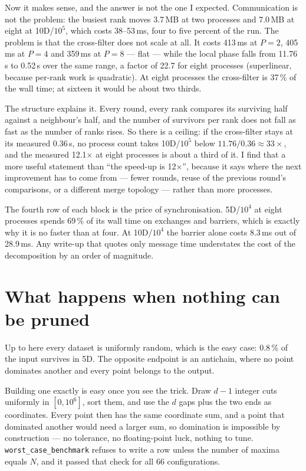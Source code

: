 \documentclass[11pt,a4paper]{article}
\newcommand{\code}[1]{\texttt{#1}}
\begin{document}
Now it makes sense, and the answer is not the one I expected. Communication is
not the problem: the busiest rank moves 3.7\,MB at two processes and 7.0\,MB at
eight at 10D/$10^5$, which costs 38--53\,ms, four to five percent of the run.
The problem is that the cross-filter does not scale at all. It costs 413\,ms at
$P=2$, 405\,ms at $P=4$ and 359\,ms at $P=8$ --- flat --- while the local phase
falls from 11.76\,s to 0.52\,s over the same range, a factor of 22.7 for eight
processes (superlinear, because per-rank work is quadratic). At eight processes
the cross-filter is 37\,\% of the wall time; at sixteen it would be about two
thirds.

The structure explains it. Every round, every rank compares its surviving half
against a neighbour's half, and the number of survivors per rank does not fall as
fast as the number of ranks rises. So there is a ceiling: if the cross-filter
stays at its measured 0.36\,s, no process count takes 10D/$10^5$ below
$11.76/0.36 \approx 33\times$, and the measured 12.1$\times$ at eight processes
is about a third of it. I find that a more useful statement than ``the speed-up
is 12$\times$'', because it says where the next improvement has to come from ---
fewer rounds, reuse of the previous round's comparisons, or a different merge
topology --- rather than more processes.

The fourth row of each block is the price of synchronisation. 5D/$10^4$ at
eight processes spends 69\,\% of its wall time on exchanges and barriers, which
is exactly why it is no faster than at four. At 10D/$10^4$ the barrier alone
costs 8.3\,ms out of 28.9\,ms. Any write-up that quotes only message time
understates the cost of the decomposition by an order of magnitude.

\section{What happens when nothing can be pruned}
\label{sec:worstcase}

Up to here every dataset is uniformly random, which is the easy case: 0.8\,\% of
the input survives in 5D. The opposite endpoint is an antichain, where no point
dominates another and every point belongs to the output.

Building one exactly is easy once you see the trick. Draw $d-1$ integer cuts
uniformly in $[0,10^6]$, sort them, and use the $d$ gaps plus the two ends as
coordinates. Every point then has the same coordinate sum, and a point that
dominated another would need a larger sum, so domination is impossible by
construction --- no tolerance, no floating-point luck, nothing to tune.
\code{worst\_case\_benchmark} refuses to write a row unless the number of maxima
equals $N$, and it passed that check for all 66 configurations.
\end{document}
